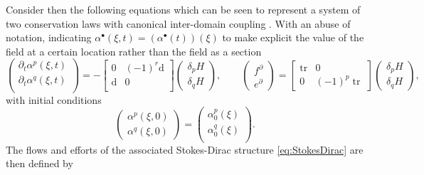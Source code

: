 \documentclass{elsarticle}
\renewcommand\d{\ensuremath{\mathrm{d}}}
\DeclareMathOperator{\tr}{tr}
\begin{document}
Consider then the following equations which can be seen to represent a system of two conservation laws with canonical inter-domain coupling \cite{vanderSchaft2002}. With an abuse of notation, indicating 
$\alpha^\bullet(\xi, t)= (\alpha^\bullet (t))(\xi)$ to make explicit the value of the field at a certain location rather than the field as a section
\begin{equation}\label{eq:pHsys}
    \begin{pmatrix}
        \partial_t \alpha^p(\xi, t) \\
        \partial_t \alpha^q(\xi, t) \\
    \end{pmatrix} = -
    \begin{bmatrix}
    0 & (-1)^r \d \\
    \d & 0 \\
    \end{bmatrix}
    \begin{pmatrix}
        \delta_{p} H \\
        \delta_{q} H
    \end{pmatrix}, \qquad 
    \begin{pmatrix}
        {f}^\partial \\
        {e}^\partial
    \end{pmatrix} = 
    \begin{bmatrix}
    \tr & 0 \\
    0 &  (-1)^p\tr
    \end{bmatrix}
    \begin{pmatrix}
        \delta_{p} H \\
        \delta_{q} H
    \end{pmatrix},  
\end{equation}
with initial conditions
\begin{equation}
    \begin{pmatrix}
        \alpha^p(\xi, 0) \\
        \alpha^q(\xi, 0)
    \end{pmatrix} = 
    \begin{pmatrix}
        \alpha^p_0(\xi) \\
        \alpha^q_0(\xi) \\
    \end{pmatrix}.
\end{equation}
The flows and efforts of the associated Stokes-Dirac 
structure \eqref{eq:StokesDirac} are then defined by
\end{document}
